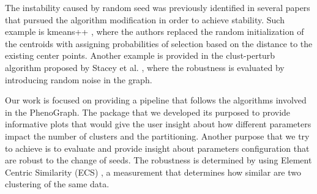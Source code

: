 \documentclass[12pt]{report}
\begin{document}
    The instability caused by random seed was previously identified in several papers that pursued the algorithm modification in order to achieve stability. Such example is kmeans++ \cite{kmeanspp}, where the authors replaced the random initialization of the centroids with assigning probabilities of selection based on the distance to the existing center points. Another example is provided in the clust-perturb algorithm proposed by Stacey et al. \cite{STACEY2021}, where the robustness is evaluated by introducing random noise in the graph.

    Our work is focused on providing a pipeline that follows the algorithms involved in the PhenoGraph. The package that we developed its purposed to provide informative plots that would give the user insight about how different parameters impact the number of clusters and the partitioning. Another purpose that we try to achieve is to evaluate and provide insight about parameters configuration that are robust to the change of seeds. The robustness is determined by using Element Centric Similarity (ECS) \cite{Gates2019}, a measurement that determines how similar are two clustering of the same data. 




    
    {}
    
\end{document}
